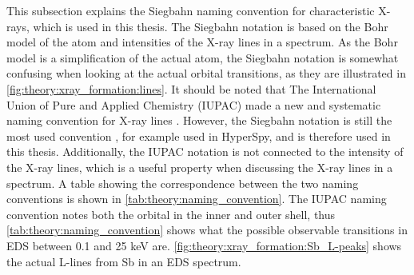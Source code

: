 This subsection explains the Siegbahn naming convention for characteristic X-rays, which is used in this thesis.
The Siegbahn notation is based on the Bohr model of the atom and intensities of the X-ray lines in a spectrum.
As the Bohr model is a simplification of the actual atom, the Siegbahn notation is somewhat confusing when looking at the actual orbital transitions, as they are illustrated in \cref{fig:theory:xray_formation:lines}.
It should be noted that The International Union of Pure and Applied Chemistry (IUPAC) made a new and systematic naming convention for X-ray lines \cite{IUPAC_nomenclature1991}.
However, the Siegbahn notation is still the most used convention \cite[Ch. 4.2.4]{goldstein_scanning_2018}, for example used in HyperSpy, and is therefore used in this thesis.
Additionally, the IUPAC notation is not connected to the intensity of the X-ray lines, which is a useful property when discussing the X-ray lines in a spectrum.
A table showing the correspondence between the two naming conventions is shown in \cref{tab:theory:naming_convention}.
The IUPAC naming convention notes both the orbital in the inner and outer shell, thus \cref{tab:theory:naming_convention} shows what the possible observable transitions in EDS between 0.1 and 25 keV are.
\cref{fig:theory:xray_formation:Sb_L-peaks} shows the actual L-lines from Sb in an EDS spectrum.



